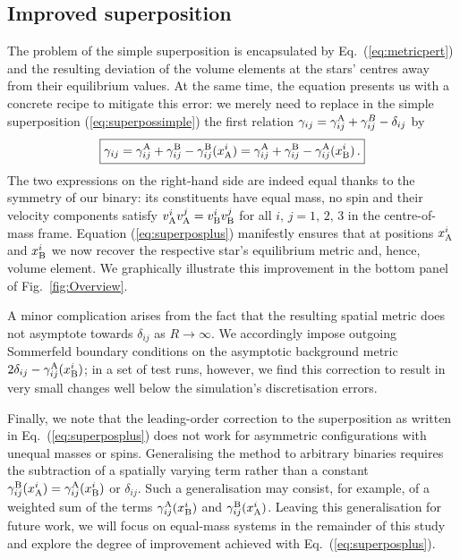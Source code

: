 \documentclass[]{iopart}
\begin{document}
\subsection{Improved superposition}
%
The problem of the simple superposition is encapsulated by
Eq.~(\ref{eq:metricpert}) and the resulting deviation of the volume
elements at the stars' centres away from their equilibrium values.
At the same time, the equation presents us with a concrete recipe
to mitigate this error: we merely need to replace in the simple
superposition (\ref{eq:superpossimple}) the first relation
$\gamma_{ij}=\gamma_{ij}^{\rm A}+\gamma_{ij}^B -\delta_{ij}$ by
%
\begin{equation}
  \boxed{
  \gamma_{ij}=\gamma_{ij}^{\rm A}+\gamma_{ij}^{\rm B}
  -\gamma_{ij}^{\rm B}(x^i_{\rm A})
  =\gamma_{ij}^{\rm A}+\gamma_{ij}^{\rm B}
  -\gamma_{ij}^{\rm A}(x^i_{\rm B})\,.}
  \label{eq:superposplus}
\end{equation}
%
The two expressions on the right-hand side are indeed equal thanks
to the symmetry of our binary: its constituents have equal mass,
no spin and their velocity components satisfy $v_{\rm A}^i v_{\rm
A}^j=v_{\rm B}^i v_{\rm B}^j$ for all $i,\,j=1,\,2,\,3$ in the
centre-of-mass frame.  Equation (\ref{eq:superposplus}) manifestly
ensures that at positions $x_{\rm A}^i$ and $x_{\rm B}^i$ we now
recover the respective star's equilibrium metric and, hence, volume
element.  We graphically illustrate this improvement in the bottom
panel of Fig.~\ref{fig:Overview}.

A minor complication arises from the fact that the resulting spatial
metric does not asymptote towards $\delta_{ij}$ as $R\rightarrow
\infty$. We accordingly impose outgoing Sommerfeld boundary conditions
on the asymptotic background metric $2\delta_{ij}-\gamma_{ij}^{\rm
A}(x^i_{\rm B})$; in a set of test runs, however, we find this
correction to result in very small changes well below the simulation's
discretisation errors.

Finally, we note that the leading-order correction to the superposition
as written in Eq.~(\ref{eq:superposplus}) does not work for asymmetric
configurations with unequal masses or spins. Generalising the method
to arbitrary binaries requires the subtraction of a spatially varying
term rather than a constant $\gamma_{ij}^{\rm B}(x^i_{\rm
A})=\gamma_{ij}^{\rm A}(x^i_{\rm B})$ or $\delta_{ij}$. Such a
generalisation may consist, for example, of a weighted sum of the
terms $\gamma_{ij}^{\rm A}(x^i_{\rm B})$ and $\gamma_{ij}^{\rm
B}(x^i_{\rm A})$. Leaving this generalisation for future work, we
will focus on equal-mass systems in the remainder of this study and
explore the degree of improvement achieved with
Eq.~(\ref{eq:superposplus}).
\end{document}
